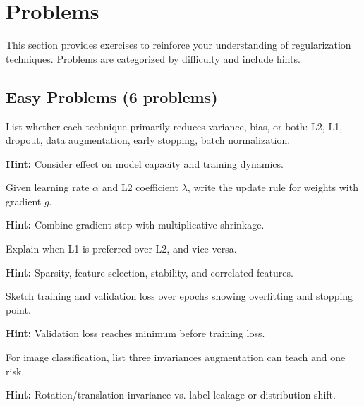 
\section{Problems}
\label{sec:ch7-problems}

This section provides exercises to reinforce your understanding of regularization techniques. Problems are categorized by difficulty and include hints.

\subsection{Easy Problems (6 problems)}

\begin{problem}
List whether each technique primarily reduces variance, bias, or both: L2, L1, dropout, data augmentation, early stopping, batch normalization.

\textbf{Hint:} Consider effect on model capacity and training dynamics.
\end{problem}

\begin{problem}
Given learning rate $\alpha$ and L2 coefficient $\lambda$, write the update rule for weights with gradient $g$.

\textbf{Hint:} Combine gradient step with multiplicative shrinkage.
\end{problem}

\begin{problem}[L1 vs L2]
Explain when L1 is preferred over L2, and vice versa.

\textbf{Hint:} Sparsity, feature selection, stability, and correlated features.
\end{problem}

\begin{problem}
Sketch training and validation loss over epochs showing overfitting and stopping point.

\textbf{Hint:} Validation loss reaches minimum before training loss.
\end{problem}

\begin{problem}
For image classification, list three invariances augmentation can teach and one risk.

\textbf{Hint:} Rotation/translation invariance vs. label leakage or distribution shift.
\end{problem}


